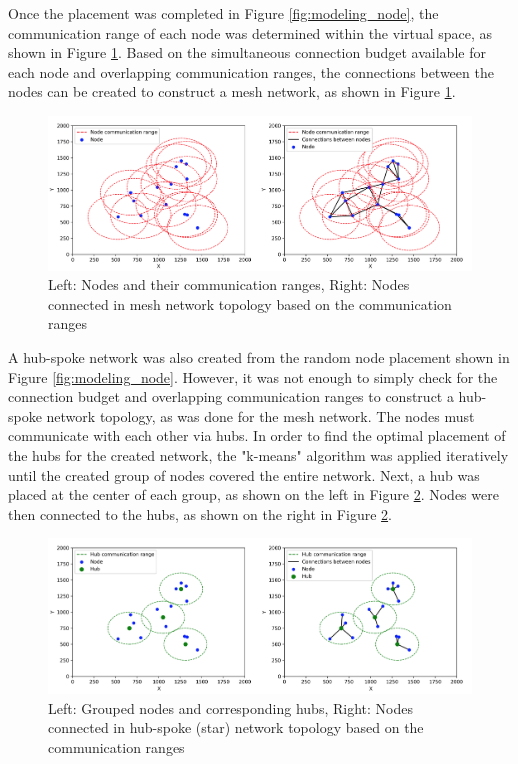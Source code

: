 Once the placement was completed in Figure \ref{fig:modeling_node}, the communication range of each node was determined within the virtual space, as shown in Figure \ref{fig:modeling_mesh}. Based on the simultaneous connection budget available for each node and overlapping communication ranges, the connections between the nodes can be created to construct a mesh network, as shown in Figure \ref{fig:modeling_mesh}.

\begin{figure}[H]
    \centering
    \includegraphics[width=0.88\columnwidth]{images/modeling_mesh.png}
    \caption{Left: Nodes and their communication ranges, Right: Nodes connected in mesh network topology based on the communication ranges}
    \label{fig:modeling_mesh}
\end{figure}

A hub-spoke network was also created from the random node placement shown in Figure \ref{fig:modeling_node}. However, it was not enough to simply check for the connection budget and overlapping communication ranges to construct a hub-spoke network topology, as was done for the mesh network. The nodes must communicate with each other via hubs. In order to find the optimal placement of the hubs for the created network, the "k-means" algorithm was applied iteratively until the created group of nodes covered the entire network. Next, a hub was placed at the center of each group, as shown on the left in Figure \ref{fig:modeling_star}. Nodes were then connected to the hubs, as shown on the right in Figure \ref{fig:modeling_star}.

\begin{figure}[H]
    \centering
    \includegraphics[width=0.88\columnwidth]{images/modeling_star.png}
    \caption{Left: Grouped nodes and corresponding hubs, Right: Nodes connected in hub-spoke (star) network topology based on the communication ranges}
    \label{fig:modeling_star}
\end{figure}

